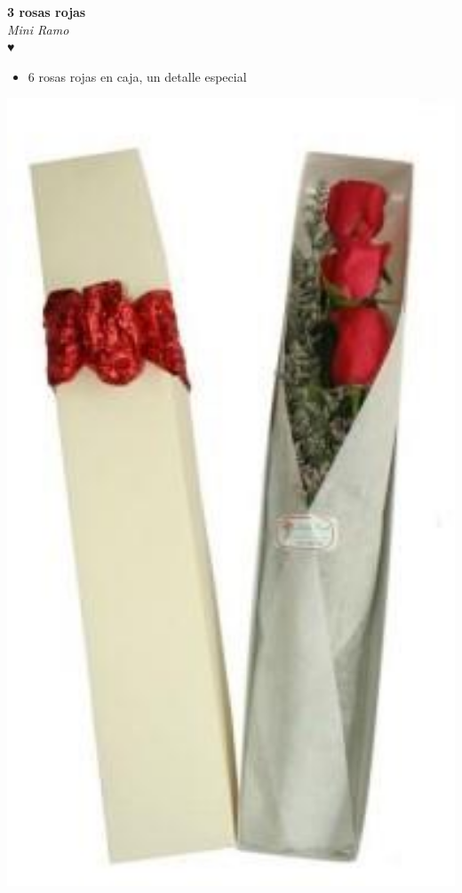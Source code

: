 \documentclass[12pt]{article}
\begin{document}
\noindent
\begin{minipage}{0.6\textwidth}
    \textcolor[HTML]{FF8C00}{\textbf{\huge 3 rosas rojas }}\\
    {\textit{Mini Ramo}} \\
    \textcolor[HTML]{FF8C00}{\Huge ♥} \\
    \vspace{0.5cm}
    \begin{itemize}
        \item 6 rosas rojas en caja, un detalle especial
    \end{itemize}
\end{minipage}
\hspace{1cm}
\begin{minipage}{0.35\textwidth}
    \includegraphics[width=1.0\textwidth]{imagenes_extraidas/image_5_5}
\end{minipage}
\end{document}
